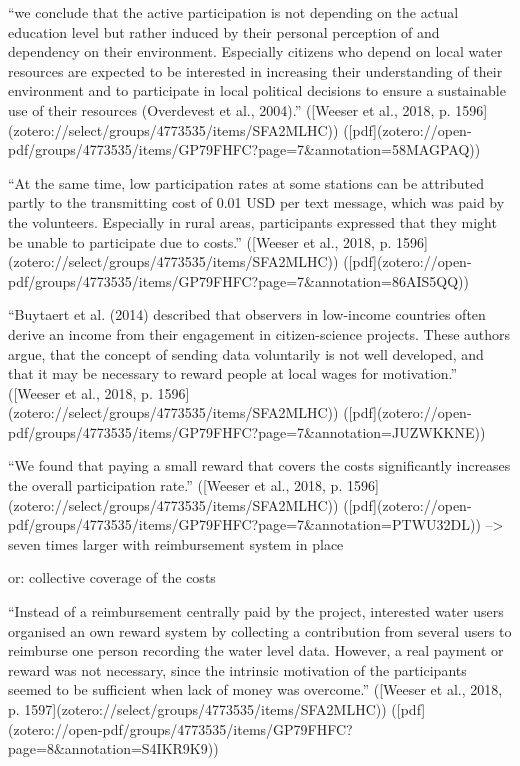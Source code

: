 {“we conclude that the active participation is not depending on the actual education level but rather induced by their personal perception of and dependency on their environment. Especially citizens who depend on local water resources are expected to be interested in increasing their understanding of their environment and to participate in local political decisions to ensure a sustainable use of their resources (Overdevest et al., 2004).” ([Weeser et al., 2018, p. 1596](zotero://select/groups/4773535/items/SFA2MLHC)) ([pdf](zotero://open-pdf/groups/4773535/items/GP79FHFC?page=7&annotation=58MAGPAQ))

“At the same time, low participation rates at some stations can be attributed partly to the transmitting cost of 0.01 USD per text message, which was paid by the volunteers. Especially in rural areas, participants expressed that they might be unable to participate due to costs.” ([Weeser et al., 2018, p. 1596](zotero://select/groups/4773535/items/SFA2MLHC)) ([pdf](zotero://open-pdf/groups/4773535/items/GP79FHFC?page=7&annotation=86AIS5QQ))

“Buytaert et al. (2014) described that observers in low-income countries often derive an income from their engagement in citizen-science projects. These authors argue, that the concept of sending data voluntarily is not well developed, and that it may be necessary to reward people at local wages for motivation.” ([Weeser et al., 2018, p. 1596](zotero://select/groups/4773535/items/SFA2MLHC)) ([pdf](zotero://open-pdf/groups/4773535/items/GP79FHFC?page=7&annotation=JUZWKKNE))

“We found that paying a small reward that covers the costs significantly increases the overall participation rate.” ([Weeser et al., 2018, p. 1596](zotero://select/groups/4773535/items/SFA2MLHC)) ([pdf](zotero://open-pdf/groups/4773535/items/GP79FHFC?page=7&annotation=PTWU32DL))
--> seven times larger with reimbursement system in place


or: collective coverage of the costs

“Instead of a reimbursement centrally paid by the project, interested water users organised an own reward system by collecting a contribution from several users to reimburse one person recording the water level data. However, a real payment or reward was not necessary, since the intrinsic motivation of the participants seemed to be sufficient when lack of money was overcome.” ([Weeser et al., 2018, p. 1597](zotero://select/groups/4773535/items/SFA2MLHC)) ([pdf](zotero://open-pdf/groups/4773535/items/GP79FHFC?page=8&annotation=S4IKR9K9))


}
